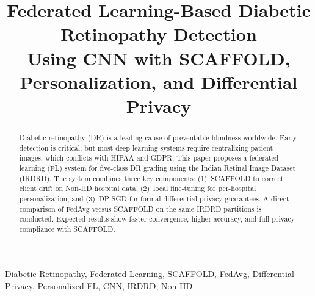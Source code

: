 \documentclass[10pt, conference]{IEEEtran}
\begin{document}

\title{Federated Learning-Based Diabetic Retinopathy Detection\\
Using CNN with SCAFFOLD, Personalization, and Differential Privacy}

\author{
  \and
}

\maketitle

\begin{abstract}
Diabetic retinopathy (DR) is a leading cause of preventable blindness worldwide.
Early detection is critical, but most deep learning systems require centralizing
patient images, which conflicts with HIPAA and GDPR. This paper proposes a
federated learning (FL) system for five-class DR grading using the Indian Retinal
Image Dataset (IRDRD). The system combines three key components: (1)~SCAFFOLD to
correct client drift on Non-IID hospital data, (2)~local fine-tuning for
per-hospital personalization, and (3)~DP-SGD for formal differential privacy
guarantees. A direct comparison of FedAvg versus SCAFFOLD on the same IRDRD
partitions is conducted. Expected results show faster convergence, higher
accuracy, and full privacy compliance with SCAFFOLD.
\end{abstract}

\begin{IEEEkeywords}
Diabetic Retinopathy, Federated Learning, SCAFFOLD, FedAvg, Differential
Privacy, Personalized FL, CNN, IRDRD, Non-IID
\end{IEEEkeywords}
\end{document}
